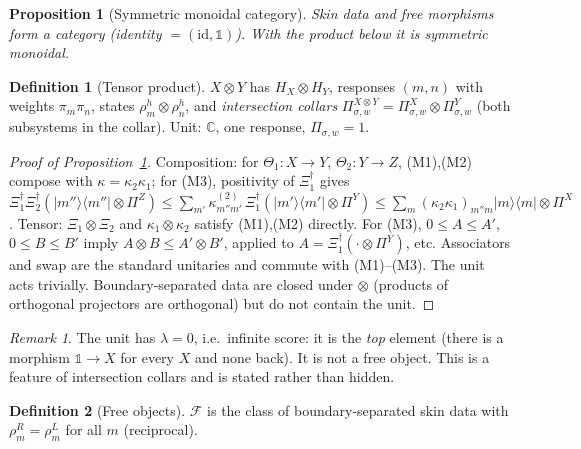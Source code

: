 \documentclass[11pt]{article}
\newtheorem{proposition}[theorem]{Proposition}
\theoremstyle{definition}
\newtheorem{definition}{Definition}
\theoremstyle{remark}
\newtheorem{remark}{Remark}
\begin{document}
\begin{proposition}[Symmetric monoidal category]\label{prop:cat}
Skin data and free morphisms form a category (identity $=(\mathrm{id},\mathbb 1)$). With the product below it is symmetric monoidal.
\end{proposition}
\begin{definition}[Tensor product]\label{def:tensor}
$X\otimes Y$ has $H_X\otimes H_Y$, responses $(m,n)$ with weights $\pi_m\pi_n$, states $\rho^h_m\otimes\rho^h_n$, and \emph{intersection collars} $\Pi^{X\otimes Y}_{\sigma,w}=\Pi^X_{\sigma,w}\otimes\Pi^Y_{\sigma,w}$ (both subsystems in the collar). Unit: $\mathbb C$, one response, $\Pi_{\sigma,w}=1$.
\end{definition}
\begin{proof}[Proof of Proposition~\ref{prop:cat}]
Composition: for $\Theta_1:X\to Y$, $\Theta_2:Y\to Z$, (M1),(M2) compose with $\kappa=\kappa_2\kappa_1$; for (M3), positivity of $\Xi_1^\dagger$ gives $\Xi_1^\dagger\Xi_2^\dagger(|m''\rangle\!\langle m''|\otimes\Pi^Z)\le\sum_{m'}\kappa^{(2)}_{m''m'}\,\Xi_1^\dagger(|m'\rangle\!\langle m'|\otimes\Pi^Y)\le\sum_m(\kappa_2\kappa_1)_{m''m}|m\rangle\!\langle m|\otimes\Pi^X$.
Tensor: $\Xi_1\otimes\Xi_2$ and $\kappa_1\otimes\kappa_2$ satisfy (M1),(M2) directly. For (M3), $0\le A\le A'$, $0\le B\le B'$ imply $A\otimes B\le A'\otimes B'$, applied to $A=\Xi_1^\dagger(\cdot\otimes\Pi^Y)$, etc. Associators and swap are the standard unitaries and commute with (M1)--(M3). The unit acts trivially. Boundary-separated data are closed under $\otimes$ (products of orthogonal projectors are orthogonal) but do not contain the unit.
\end{proof}
\begin{remark}
The unit has $\lambda=0$, i.e.\ infinite score: it is the \emph{top} element (there is a morphism $\mathbb 1\to X$ for every $X$ and none back). It is not a free object. This is a feature of intersection collars and is stated rather than hidden.
\end{remark}

\begin{definition}[Free objects]
$\mathcal F$ is the class of boundary-separated skin data with $\rho^R_m=\rho^L_m$ for all $m$ (reciprocal).
\end{definition}
\end{document}

